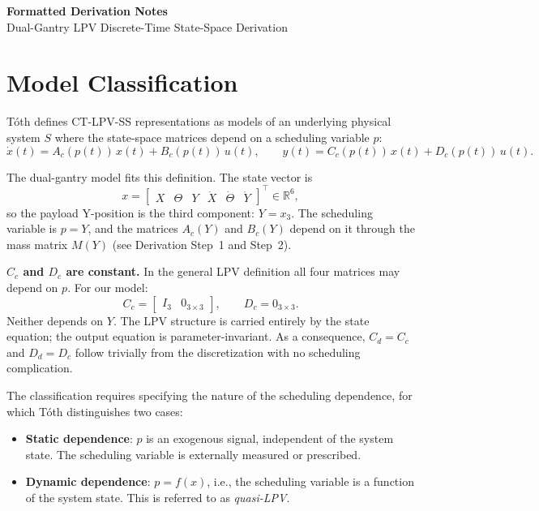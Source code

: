 \documentclass[11pt]{article}
\newcommand{\R}{\mathbb{R}}
\begin{document}
\begin{center}
    {\LARGE \textbf{Formatted Derivation Notes}}\\[0.4em]
    {\large Dual-Gantry LPV Discrete-Time State-Space Derivation}
\end{center}

\vspace{0.8em}

\section*{Model Classification}

Tóth \cite{toth2010} defines CT-LPV-SS representations as models of an underlying physical
system $S$ where the state-space matrices depend on a scheduling variable $p$:
\[
    \dot{x}(t) = A_c(p(t))\,x(t) + B_c(p(t))\,u(t), \qquad
    y(t) = C_c(p(t))\,x(t) + D_c(p(t))\,u(t).
\]

The dual-gantry model fits this definition. The state vector is
\[
    x = \begin{bmatrix} X & \Theta & Y & \dot{X} & \dot{\Theta} & \dot{Y} \end{bmatrix}^\top \in \R^6,
\]
so the payload Y-position is the third component: $Y = x_3$.
The scheduling variable is $p = Y$, and the matrices $A_c(Y)$ and $B_c(Y)$ depend on it
through the mass matrix $M(Y)$ (see Derivation Step~1 and Step~2).

\textbf{$C_c$ and $D_c$ are constant.}
In the general LPV definition all four matrices may depend on $p$. For our model:
\[
    C_c = \begin{bmatrix} I_3 & 0_{3\times 3} \end{bmatrix}, \qquad D_c = 0_{3\times 3}.
\]
Neither depends on $Y$. The LPV structure is carried entirely by the state equation; the
output equation is parameter-invariant. As a consequence, $C_d = C_c$ and $D_d = D_c$
follow trivially from the discretization with no scheduling complication.

The classification requires specifying the nature of the scheduling dependence, for which
Tóth distinguishes two cases:

\begin{itemize}
    \item \textbf{Static dependence}: $p$ is an exogenous signal, independent of the system
    state. The scheduling variable is externally measured or prescribed.
    \item \textbf{Dynamic dependence}: $p = f(x)$, i.e., the scheduling variable is a
    function of the system state. This is referred to as \emph{quasi-LPV}.
\end{itemize}
\end{document}
